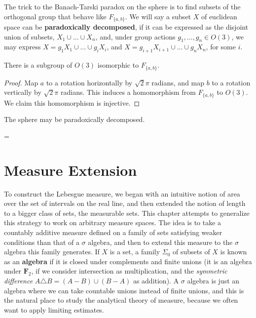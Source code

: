 The trick to the Banach-Tarski paradox on the sphere is to find subsets of the orthogonal group that behave like $F_{\{a,b\}}$. We will say a subset $X$ of euclidean space can be {\bf paradoxically decomposed}, if it can be expressed as the disjoint union of subsets, $X_1 \cup \dots \cup X_n$, and, under group actions $g_1, \dots, g_n \in O(3)$, we may express $X = g_1X_1 \cup \dots \cup g_iX_i$, and $X = g_{i+1}X_{i+1} \cup \dots \cup g_nX_n$, for some $i$.

\begin{lemma}
    There is a subgroup of $O(3)$ isomorphic to $F_{\{a,b\}}$.
\end{lemma}
\begin{proof}
    Map $a$ to a rotation horizontally by $\sqrt{2}\pi$ radians, and map $b$ to a rotation vertically by $\sqrt{2}\pi$ radians. This induces a homomorphism from $F_{\{a,b\}}$ to $O(3)$. We claim this homomorphism is injective.
\end{proof}

\begin{theorem}
    The sphere may be paradoxically decomposed.
\end{theorem}
=
\chapter{Measure Extension}

To construct the Lebesgue measure, we began with an intuitive notion of area over the set of intervals on the real line, and then extended the notion of length to a bigger class of sets, the measurable sets. This chapter attempts to generalize this strategy to work on arbitrary measure spaces. The idea is to take a countably additive measure defined on a family of sets satisfying weaker conditions than that of a $\sigma$ algebra, and then to extend this measure to the $\sigma$ algebra this family generates. If $X$ is a set, a family $\Sigma_0$ of subsets of $X$ is known as an {\bf algebra} if it is closed under complements and finite unions (it is an algebra under $\mathbf{F}_2$, if we consider intersection as multiplication, and the {\it symmetric difference} $A \triangle B = (A - B) \cup (B - A)$ as addition). A $\sigma$ algebra is just an algebra where we can take countable unions instead of finite unions, and this is the natural place to study the analytical theory of measure, because we often want to apply limiting estimates.

